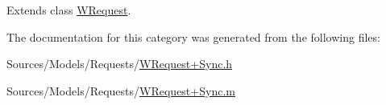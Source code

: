 Extends class \hyperlink{interface_w_request_a4a1398a9ef7ce9afcc3e02cdb85322c9}{W\-Request}.



The documentation for this category was generated from the following files\-:\begin{DoxyCompactItemize}
\item 
Sources/\-Models/\-Requests/\hyperlink{_w_request_09_sync_8h}{W\-Request+\-Sync.\-h}\item 
Sources/\-Models/\-Requests/\hyperlink{_w_request_09_sync_8m}{W\-Request+\-Sync.\-m}\end{DoxyCompactItemize}

